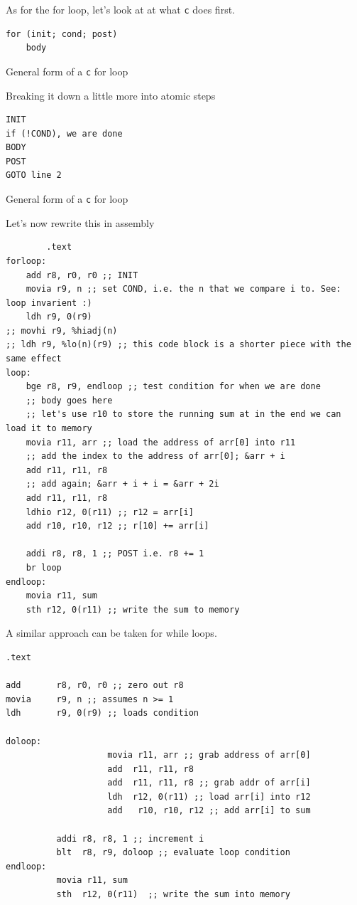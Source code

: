\documentclass[../notes.tex]{subfiles}
\begin{document}
As for the for loop, let's look at at what \texttt{c} does first.

\begin{listing}[H]
\begin{verbatim}
for (init; cond; post)
	body
\end{verbatim}
\caption{General form of a \texttt{c} for loop}
\end{listing}


Breaking it down a little more into atomic steps


\begin{listing}[H]
\begin{verbatim}
INIT
if (!COND), we are done
BODY
POST
GOTO line 2
\end{verbatim}
\caption{General form of a \texttt{c} for loop}
\end{listing}

Let's now rewrite this in assembly

\begin{listing}[H]
\begin{verbatim}
		.text
forloop:
	add r8, r0, r0 ;; INIT
	movia r9, n ;; set COND, i.e. the n that we compare i to. See: loop invarient :)
	ldh r9, 0(r9)
;; movhi r9, %hiadj(n)
;; ldh r9, %lo(n)(r9) ;; this code block is a shorter piece with the same effect
loop:
	bge r8, r9, endloop ;; test condition for when we are done
	;; body goes here
	;; let's use r10 to store the running sum at in the end we can load it to memory
	movia r11, arr ;; load the address of arr[0] into r11
	;; add the index to the address of arr[0]; &arr + i
	add r11, r11, r8
	;; add again; &arr + i + i = &arr + 2i
	add r11, r11, r8
	ldhio r12, 0(r11) ;; r12 = arr[i]
	add r10, r10, r12 ;; r[10] += arr[i]
	
	addi r8, r8, 1 ;; POST i.e. r8 += 1
	br loop
endloop:
	movia r11, sum
	sth r12, 0(r11) ;; write the sum to memory
\end{verbatim}
\end{listing}


A similar approach can be taken for while loops.


\begin{listing}[H]
\begin{verbatim}
.text
    
add       r8, r0, r0 ;; zero out r8
movia     r9, n ;; assumes n >= 1
ldh       r9, 0(r9) ;; loads condition
    
doloop:  
					movia r11, arr ;; grab address of arr[0]
					add  r11, r11, r8 
					add  r11, r11, r8 ;; grab addr of arr[i]
					ldh  r12, 0(r11) ;; load arr[i] into r12
					add   r10, r10, r12 ;; add arr[i] to sum
 
          addi r8, r8, 1 ;; increment i
          blt  r8, r9, doloop ;; evaluate loop condition
endloop:
          movia r11, sum
          sth  r12, 0(r11)  ;; write the sum into memory
\end{verbatim}
\end{listing}
\end{document}

